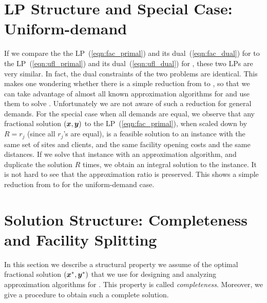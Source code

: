 \documentclass[oneside,final]{ucr}
\begin{document}

\section{LP Structure and Special Case: Uniform-demand}
\label{sec:ftfp_uniform_demand}

If we compare the the LP~(\ref{eqn:fac_primal}) and its
dual~(\ref{eqn:fac_dual}) for {\FTFP} to the
LP~(\ref{eqn:ufl_primal}) and its dual~(\ref{eqn:ufl_dual})
for {\UFL}, these two LPs are very similar. In fact, the
dual constraints of the two problems are identical. This
makes one wondering whether there is a simple reduction from
{\FTFP} to {\UFL}, so that we can take advantage of almost
all known approximation algorithms for {\UFL} and use them
to solve {\FTFP}. Unfortunately we are not aware of such a
reduction for general demands. For the special case when all
demands are equal, we observe that any fractional solution
$(\boldsymbol{x},\boldsymbol{y})$ to the LP~(\ref{eqn:fac_primal}), when scaled
down by $R = r_j$ (since all $r_j$'s are equal), is a
feasible solution to an {\UFL} instance with the same set of
sites and clients, and the same facility opening costs and
the same distances. If we solve that {\UFL} instance with an
approximation algorithm, and duplicate the solution $R$
times, we obtain an integral solution to the {\FTFP}
instance. It is not hard to see that the approximation ratio
is preserved. This shows a simple reduction from {\FTFP} to
{\UFL} for the uniform-demand case.

\section{Solution Structure: Completeness and Facility
  Splitting}
\label{sec:ftfp_complete}
In this section we describe a structural property we assume
of the optimal fractional solution $(\boldsymbol{x}^\ast, \boldsymbol{y}^\ast)$
that we use for designing and analyzing approximation
algorithms for {\FTFP}. This property is called
\emph{completeness}. Moreover, we give a procedure to obtain
such a complete solution.
\end{document}
